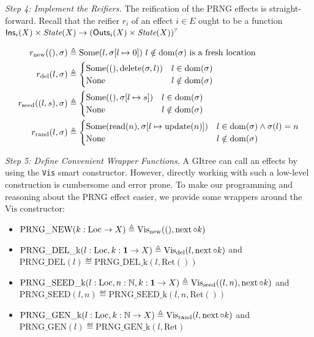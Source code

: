 \documentclass{article}
\theoremstyle{definition}
\theoremstyle{plain}
\theoremstyle{remark}
\newcommand{\Ins}{\mathsf{Ins}}
\newcommand{\Outs}{\mathsf{Outs}}
\newcommand{\new}{\mathrm{new}}
\newcommand{\del}{\mathrm{del}}
\newcommand{\seed}{\mathrm{seed}}
\newcommand{\rand}{\mathrm{rand}}
\newcommand{\gRet}{\mathrm{Ret}}
\newcommand{\gVis}{\mathrm{Vis}}
\DeclareMathOperator*{\Next}{\mathrm{next}}
\newcommand{\out}{\mathrm{read}}
\newcommand{\upd}{\mathrm{update}}
\begin{document}
\emph{Step 4: Implement the Reifiers.} The reification of the PRNG effects is straight-forward.
Recall that the reifier \(r_i\) of an effect \(i \in E\) ought to be a function \(\Ins_{i}(X) \times \State(X) \to \option{( \Outs_{i}(X) \times \State(X) )} \)

\begin{align*}
  r_{\new}((), \sigma) & \eqdef \Some(l, \sigma[l\mapsto 0]) \text{ \(l \notin \dom(\sigma)\) is a fresh location}\\
  r_{\del}(l,\sigma) & \eqdef \begin{cases}
    \Some((), \mathrm{delete}(\sigma,l)) & l \in \dom(\sigma)\\
    \None & l \notin \dom(\sigma)\\
  \end{cases} \\
    r_{\seed}((l,s), \sigma) & \eqdef \begin{cases}
      \Some((), \sigma[l\mapsto s]) & l \in \dom(\sigma)\\
      \None & l \notin \dom(\sigma)\\
    \end{cases}\\
      r_{\rand}(l,\sigma) & \eqdef \begin{cases}
        \Some(\out(n), \sigma[l\mapsto \upd(n)]) & l \in \dom(\sigma) \land \sigma(l) = n\\
        \None & l \notin \dom(\sigma)\\
      \end{cases}
      \end{align*}

\emph{Step 5: Define Convenient Wrapper Functions.} A GItree can call an effects by using the \texttt{Vis} smart constructor. However, directly working with such a low-level construction is cumbersome and error prone.
To make our programming and reasoning about the PRNG effect easier, we provide some wrappers around the \(\gVis\) constructor:

\begin{itemize}
  \item \(\mathrm{PRNG\_NEW}(k : \iLoc \to X) \eqdef \gVis_{\new}((), \Next \circ k)\)
  \item \(\mathrm{PRNG\_DEL\_k}(l : \iLoc, k : \mathbf{1} \to X) \eqdef \gVis_{\del}(l, \Next \circ k)\)
    and \(\mathrm{PRNG\_DEL}(l) \eqdef \mathrm{PRNG\_DEL\_k}(l, \gRet())\)
  \item \(\mathrm{PRNG\_SEED\_k}(l : \iLoc, n : \mathbb{N}, k: \mathbf{1} \to X) \eqdef \gVis_{\seed}((l,n), \Next \circ k)\)
    and\\ \(\mathrm{PRNG\_SEED}(l,n) \eqdef \mathrm{PRNG\_SEED\_k}(l, n, \gRet())\)
  \item \(\mathrm{PRNG\_GEN\_k}(l : \iLoc, k: \mathbb{N} \to X) \eqdef \gVis_{\rand}(l, \Next \circ k)\) and \(\mathrm{PRNG\_GEN}(l) \eqdef \mathrm{PRNG\_GEN\_k}(l, \gRet)\)
\end{itemize}
\end{document}
